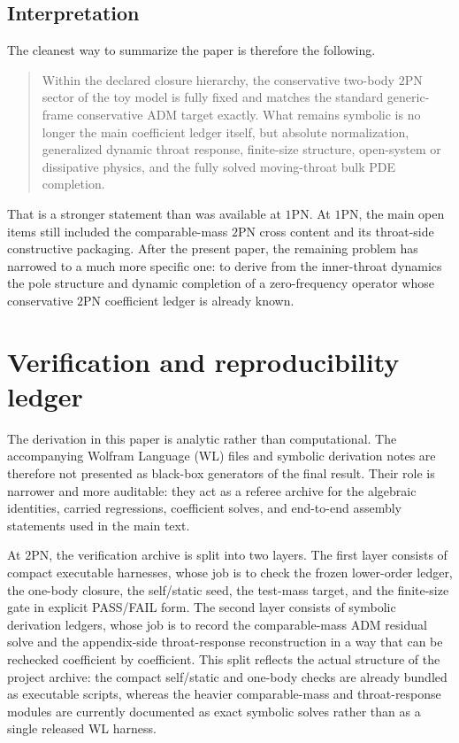\documentclass[11pt]{article}
\newcommand{\OnePN}{\mathrm{1PN}}
\newcommand{\TwoPN}{\mathrm{2PN}}
\newcommand{\ADM}{\mathrm{ADM}}
\begin{document}
\subsection{Interpretation}
\label{sec:status-interpretation}

The cleanest way to summarize the paper is therefore the following.

\begin{quote}
Within the declared closure hierarchy, the conservative two-body \(\TwoPN\) sector of
the toy model is fully fixed and matches the standard generic-frame conservative
\(\ADM\) target exactly.  What remains symbolic is no longer the main coefficient ledger
itself, but absolute normalization, generalized dynamic throat response, finite-size
structure, open-system or dissipative physics, and the fully solved moving-throat bulk
PDE completion.
\end{quote}

That is a stronger statement than was available at \(\OnePN\).
At \(\OnePN\), the main open items still included the comparable-mass \(\TwoPN\)
cross content and its throat-side constructive packaging.
After the present paper, the remaining problem has narrowed to a much more specific one:
to derive from the inner-throat dynamics the pole structure and dynamic completion of a
zero-frequency operator whose conservative \(\TwoPN\) coefficient ledger is already known.

\section{Verification and reproducibility ledger}
\label{sec:verification}

The derivation in this paper is analytic rather than computational.  The accompanying
Wolfram Language (WL) files and symbolic derivation notes are therefore not presented as
black-box generators of the final result.  Their role is narrower and more auditable:
they act as a referee archive for the algebraic identities, carried regressions,
coefficient solves, and end-to-end assembly statements used in the main text.

At \(\TwoPN\), the verification archive is split into two layers.
The first layer consists of compact executable harnesses, whose job is to check the
frozen lower-order ledger, the one-body closure, the self/static seed, the test-mass
target, and the finite-size gate in explicit PASS/FAIL form.
The second layer consists of symbolic derivation ledgers, whose job is to record the
comparable-mass \(\ADM\) residual solve and the appendix-side throat-response
reconstruction in a way that can be rechecked coefficient by coefficient.
This split reflects the actual structure of the project archive: the compact self/static
and one-body checks are already bundled as executable scripts, whereas the heavier
comparable-mass and throat-response modules are currently documented as exact symbolic
solves rather than as a single released WL harness.
\end{document}
